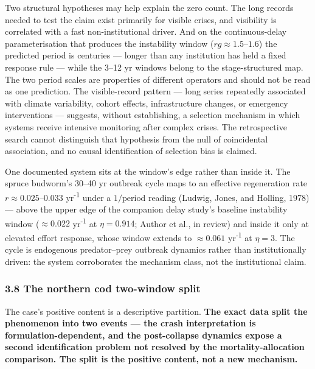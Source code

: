 \documentclass[11pt]{article}
\begin{document}
Two structural hypotheses may help explain the zero count. The long
records needed to test the claim exist primarily for visible crises, and
visibility is correlated with a fast non-institutional driver. And on
the continuous-delay parameterisation that produces the instability
window (\(rg \approx 1.5\)--\(1.6\)) the predicted period is centuries
--- longer than any institution has held a fixed response rule --- while
the 3--12 yr windows belong to the stage-structured map. The two period
scales are properties of different operators and should not be read as
one prediction. The visible-record pattern --- long series repeatedly
associated with climate variability, cohort effects, infrastructure
changes, or emergency interventions --- suggests, without establishing,
a selection mechanism in which systems receive intensive monitoring
after complex crises. The retrospective search cannot distinguish that
hypothesis from the null of coincidental association, and no causal
identification of selection bias is claimed.

One documented system sits at the window's edge rather than inside it.
The spruce budworm's 30--40 yr outbreak cycle maps to an effective
regeneration rate \(r \approx 0.025\)--\(0.033\) yr\textsuperscript{-1} under a
\(1/\mathrm{period}\) reading (Ludwig, Jones, and Holling, 1978) ---
above the upper edge of the companion delay study's baseline instability
window (\(\approx 0.022\) yr\textsuperscript{-1} at \(\eta = 0.914\); Author et al., in
review) and inside it only at elevated effort response, whose window
extends to \(\approx 0.061\) yr\textsuperscript{-1} at \(\eta = 3\). The cycle is
endogenous predator--prey outbreak dynamics rather than institutionally
driven: the system corroborates the mechanism class, not the
institutional claim.

\subsubsection{3.8 The northern cod two-window
split}\label{the-northern-cod-two-window-split}

The case's positive content is a descriptive partition. \textbf{The
exact data split the phenomenon into two events --- the crash
interpretation is formulation-dependent, and the post-collapse dynamics
expose a second identification problem not resolved by the
mortality-allocation comparison. The split is the positive content, not
a new mechanism.}
\end{document}
